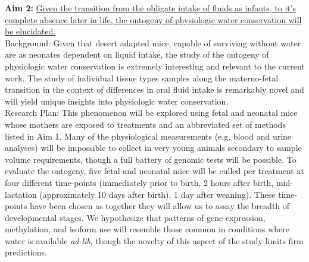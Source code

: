\documentclass[11pt]{article}
\begin{document}
%
%
%
%





\noindent \textbf{Aim 2:} \ul{Given the transition from the obligate intake of fluids as infants, to it’s complete absence later in life, the ontogeny of physiologic water conservation will be elucidated.} \\

Background: Given that desert adapted mice, capable of surviving without water are as neonates dependent on liquid intake, {the study of the ontogeny of physiologic water conservation is extremely interesting and relevant to the current work.} The study of individual tissue types samples along the materno-fetal transition in the context of differences in oral fluid intake is remarkably novel and will yield unique insights into physiologic water conservation. \\

Research Plan: This phenomenon will be explored using fetal and neonatal mice whose mothers are exposed to treatments and an abbreviated set of methods listed in Aim 1. Many of the physiological measurements  (e.g. blood and urine analyses) will be impossible to collect in very young animals secondary to sample volume requirements, though a full battery of genomic tests will be possible. To evaluate the ontogeny, five fetal and neonatal mice will be culled per treatment at four different time-points (immediately prior to birth, 2 hours after birth, mid-lactation (approximately 10 days after birth), 1 day after weaning). These time-points have been chosen as together they will allow us to assay the breadth of developmental stages.  We hypothesize that patterns of gene expression, methylation, and isoform use will resemble those common in conditions where water is available \textit{ad lib}, though the novelty of this aspect of the study limits firm predictions. \\
\end{document}
